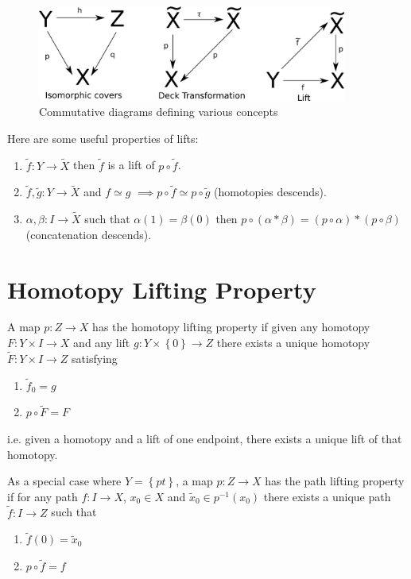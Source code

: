 \documentclass[11pt]{article}
\newenvironment{defin}
	{\begin{mdframed}[backgroundcolor=white, roundcorner=5pt, linewidth=1pt]
		\setlength{\parindent}{0pt}
		}
	{\end{mdframed}}
\newcommand{\mdf}[1]{{\color{red} #1}}
\begin{document}
\begin{figure}[ht]
	\centering
	\includegraphics[width=4in]{basicdefs_diagrams.png}	
	\caption{Commutative diagrams defining various concepts}
\end{figure}

Here are some useful properties of lifts: 
\begin{enumerate}[label=(\roman*)]
	\item $\widetilde{f}:Y\to\widetilde{X}$ then $\widetilde{f}$ is a lift of $p\circ\widetilde{f}$.
	\item $\widetilde{f},\widetilde{g}:Y\to\widetilde{X}$ and $f\simeq g$ $\implies p\circ \widetilde{f}\simeq p\circ \widetilde{g}$ (homotopies descends).
	\item $\alpha, \beta: I \to \widetilde{X}$ such that $\alpha(1)=\beta(0)$ then $p\circ (\alpha\ast\beta)=(p\circ\alpha)\ast(p\circ\beta)$ (concatenation descends).
\end{enumerate}

\section{Homotopy Lifting Property}
\begin{defin}
	A map $p:Z\to X$ has the \mdf{homotopy lifting property} if given any homotopy $F:Y\times I \to X$ and any lift $g:Y\times\left\{0\right\}\to Z$ there exists a unique homotopy $\widetilde{F}:Y\times I \to Z$ satisfying
	\begin{enumerate}[label=(\roman*)]
		\item $\widetilde{f}_0=g$
		\item $p\circ\widetilde{F}=F$
	\end{enumerate}
	i.e. given a homotopy and a lift of one endpoint, there exists a unique lift of that homotopy.

	As a special case where $Y=\left\{pt\right\}$, a map $p:Z\to X$ has the \mdf{path lifting property} if for any path $f:I\to X$, $x_0\in X$ and $\widetilde{x}_0\in p^{-1}(x_0)$ there exists a unique path $\widetilde{f}:I\to Z$ such that 
	\begin{enumerate}[label=(\roman*)]
		\item $\widetilde{f}(0)=\widetilde{x}_0$
		\item $p\circ\widetilde{f}=f$
	\end{enumerate}
\end{defin}
\end{document}
